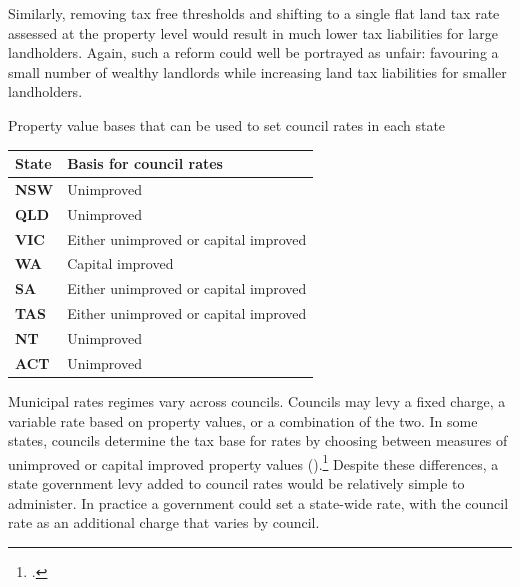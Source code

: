 \documentclass[twoside,english]{grattanBudgetRepairb5portrait}
\begin{document}
Similarly, removing tax free thresholds and shifting to a single flat land tax rate assessed at the property level would result in much lower tax liabilities for large landholders. Again, such a reform could well be portrayed as unfair: favouring a small number of wealthy landlords while increasing land tax liabilities for smaller landholders. 

\begin{table}
%
{Property value bases that can be used to set council rates in each state}
\begin{tabularx}{\columnwidth}{>{\bfseries}lX}
\toprule
\textbf{State} & \textbf{Basis for council rates} \\%
\midrule
\textbf{NSW} & Unimproved  \\[0.5\baselineskip]
\textbf{QLD} & Unimproved  \\[0.5\baselineskip]
\textbf{VIC} & Either unimproved or capital improved  \\[0.5\baselineskip]
\textbf{WA} & Capital improved  \\[0.5\baselineskip]
\textbf{SA} & Either unimproved or capital improved \\[0.5\baselineskip]
\textbf{TAS} & Either unimproved or capital improved  \\[0.5\baselineskip]
\textbf{NT} & Unimproved  \\[0.5\baselineskip]
\textbf{ACT} & Unimproved  \\%
\bottomrule
\end{tabularx}

\end{table}

Municipal rates regimes vary across councils. Councils may levy a fixed charge, a variable rate based on property values, or a combination of the two. In some states, councils determine the tax base for rates by choosing between measures of unimproved or capital improved property values ().\footcite[][198]{productivity2008assessing}  Despite these differences, a state government levy added to council rates would be relatively simple to administer. In practice a government could set a state-wide rate, with the council rate as an additional charge that varies by council.
\end{document}
